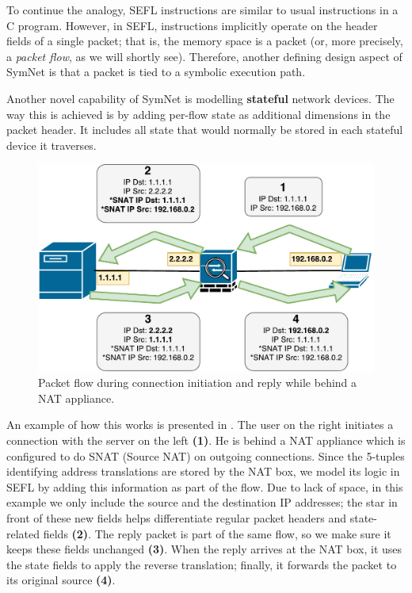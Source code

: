 To continue the analogy, SEFL instructions are similar to usual instructions in
a C program.  However, in SEFL, instructions implicitly operate on the header
fields of a single packet; that is, the memory space is a packet (or, more
precisely, a \emph{packet flow}, as we will shortly see).  Therefore, another
defining design aspect of SymNet is that a packet is tied to a symbolic
execution path.

Another novel capability of SymNet is modelling \textbf{stateful} network
devices.  The way this is achieved is by adding per-flow state as additional
dimensions in the packet header.  It includes all state that would normally be
stored in each stateful device it traverses.

\begin{figure}[h]
  \centering
  \includegraphics[scale=0.6]{src/img/snat-example}
  \caption{Packet flow during connection initiation and reply while behind a
  NAT appliance.}
  \label{fig:snat-example}
\end{figure}

An example of how this works is presented in
.  The user on the right initiates a
connection with the server on the left \textbf{(1)}.  He is behind a NAT
appliance which is configured to do SNAT (Source NAT) on outgoing connections.
Since the 5-tuples identifying address translations are stored by the NAT box,
we model its logic in SEFL by adding this information as part of the flow. Due
to lack of space, in this example we only include the source and the
destination IP addresses; the star in front of these new fields helps
differentiate regular packet headers and state-related fields \textbf{(2)}.
The reply packet is part of the same flow, so we make sure it keeps these
fields unchanged \textbf{(3)}.  When the reply arrives at the NAT box, it uses
the state fields to apply the reverse translation; finally, it forwards the
packet to its original source \textbf{(4)}.

